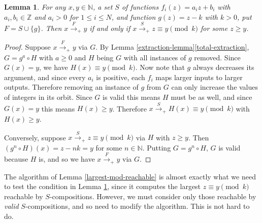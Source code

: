 \documentclass[11pt]{amsart}
\newcommand{\N}{\mathbb{N}}
\newcommand{\Z}{\mathbb{Z}}
\newtheorem{lemma}{Lemma}
\theoremstyle{definition}
\theoremstyle{remark}
\begin{document}
\begin{lemma} \label{n-lemma-cases}
For any $x,y \in \N$, a set $S$ of functions $f_i(z) = a_i z + b_i$ with $a_i, b_i \in \Z$ and $a_i > 0$ for $1 \le i \le N$, and function $g(z) = z - k$ with $k > 0$, put $F = S \cup \{g\}$. Then $x \xrightarrow{F}_+ y$ if and only if $x \xrightarrow{S}_+ z \equiv y \pmod k$ for some $z \ge y$.
\end{lemma}
\begin{proof}
Suppose $x \xrightarrow{F}_+ y$ via $G$. By Lemma \ref{extraction-lemma}\ref{total-extraction}, $G = g^a \circ H$ with $a \ge 0$ and $H$ being $G$ with all instances of $g$ removed. Since $G(x) = y$, we have $H(x) \equiv y \pmod k$. Now note that $g$ always decreases its argument, and since every $a_i$ is positive, each $f_i$ maps larger inputs to larger outputs. Therefore removing an instance of $g$ from $G$ can only increase the values of integers in its orbit. Since $G$ is valid this means $H$ must be as well, and since $G(x) = y$ this means $H(x) \ge y$. Therefore $x \xrightarrow{S}_+ H(x) \equiv y \pmod k$ with $H(x) \ge y$.

Conversely, suppose $x \xrightarrow{S}_+ z \equiv y \pmod k$ via $H$ with $z \ge y$. Then $(g^n \circ H)(x) = z - nk = y$ for some $n \in \N$. Putting $G = g^n \circ H$, $G$ is valid because $H$ is, and so we have $x \xrightarrow{F}_+ y$ via $G$.
\end{proof}

The algorithm of Lemma \ref{largest-mod-reachable} is almost exactly what we need to test the condition in Lemma \ref{n-lemma-cases}, since it computes the largest $z \equiv y \pmod k$ reachable by $S$-compositions. However, we must consider only those reachable by \emph{valid} $S$-compositions, and so need to modify the algorithm. This is not hard to do.
\end{document}

